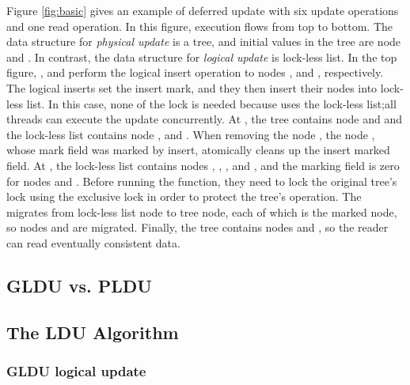 Figure \ref{fig:basic} gives an example of deferred update with six update
operations and one read operation.
In this figure, execution flows from top to bottom.
The data structure for \emph{physical update} is a tree, and initial values in
the tree are node  and .
In contrast, the data structure for \emph{logical update} is lock-less list.
In the top figure, ,  and  perform the
logical insert operation to nodes ,  and ,
 respectively.
The logical inserts set the insert mark, and they then insert their
nodes into lock-less list.
In this case, none of the lock is needed because  uses the lock-less
list;all threads can execute the update concurrently.
At , the tree contains node 
and  and 
the lock-less list contains node ,  and .
When removing the node , the node , whose mark field was marked
by insert, atomically cleans up the insert marked field.
At , the lock-less list contains nodes
, , , and , and the marking field is zero for 
nodes  and .
Before running the  function, they need to lock the original
 tree's lock using the exclusive lock in order to protect the tree's
 operation.
The  migrates from lock-less list node to tree node, each of 
which is the marked node, so nodes  and  are migrated.
Finally, the tree contains nodes  and , so the reader can read
 eventually consistent data.



\subsection{GLDU vs. PLDU}





\subsection{The LDU Algorithm}


\subsubsection{GLDU logical update}

